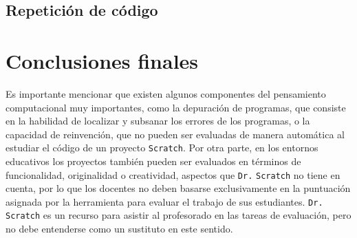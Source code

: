 \documentclass[a4paper,10pt]{article}
\begin{document}
\subsection{Repetición de código}

\section{Conclusiones finales}
Es importante mencionar que existen algunos componentes del pensamiento computacional muy importantes, como la depuración de programas, que consiste en la habilidad de localizar y subsanar los errores de los programas, o la capacidad de reinvención, que no pueden ser evaluadas de manera automática al estudiar el código de un proyecto \texttt{Scratch}. Por otra parte, en los entornos educativos los proyectos también pueden ser evaluados en términos de funcionalidad, originalidad o creatividad, aspectos que \texttt{Dr.}{\tiny{ }}\texttt{Scratch} no tiene en cuenta, por lo que los docentes no deben basarse exclusivamente en la puntuación asignada por la herramienta para evaluar el trabajo de sus estudiantes. \texttt{Dr.}{\tiny{ }}\texttt{Scratch} es un recurso para asistir al profesorado en las tareas de evaluación, pero no debe entenderse como un sustituto en este sentido.
\end{document}
